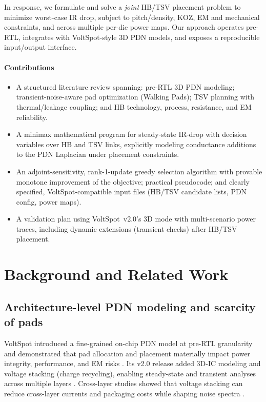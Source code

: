 \documentclass[conference]{IEEEtran}
\begin{document}
In response, we formulate and solve a \emph{joint} HB/TSV placement problem to minimize worst-case IR drop, subject to pitch/density, KOZ, EM and mechanical constraints, and across multiple per-die power maps. Our approach operates pre-RTL, integrates with VoltSpot-style 3D PDN models, and exposes a reproducible input/output interface.

\paragraph*{Contributions}
\begin{itemize}[leftmargin=*,nosep]
  \item A structured literature review spanning: pre-RTL 3D PDN modeling; transient-noise-aware pad optimization (Walking Pads); TSV planning with thermal/leakage coupling; and HB technology, process, resistance, and EM reliability.
  \item A minimax mathematical program for steady-state IR-drop with decision variables over HB and TSV links, explicitly modeling conductance additions to the PDN Laplacian under placement constraints.
  \item An adjoint-sensitivity, rank-1-update greedy selection algorithm with provable monotone improvement of the objective; practical pseudocode; and clearly specified, VoltSpot-compatible input files (HB/TSV candidate lists, PDN config, power maps).
  \item A validation plan using VoltSpot~v2.0’s 3D mode with multi-scenario power traces, including dynamic extensions (transient checks) after HB/TSV placement.
\end{itemize}

\section{Background and Related Work}
\subsection{Architecture-level PDN modeling and scarcity of pads}
VoltSpot introduced a fine-grained on-chip PDN model at pre-RTL granularity and demonstrated that pad allocation and placement materially impact power integrity, performance, and EM risks \cite{ZhangISCA2014,VoltSpot,SkadronPage}. Its v2.0 release added 3D-IC modeling and voltage stacking (charge recycling), enabling steady-state and transient analyses across multiple layers \cite{VoltSpotHOWTO}. Cross-layer studies showed that voltage stacking can reduce cross-layer currents and packaging costs while shaping noise spectra \cite{ZhangDAC2015,ZhangISLPED2015}. 
\end{document}
